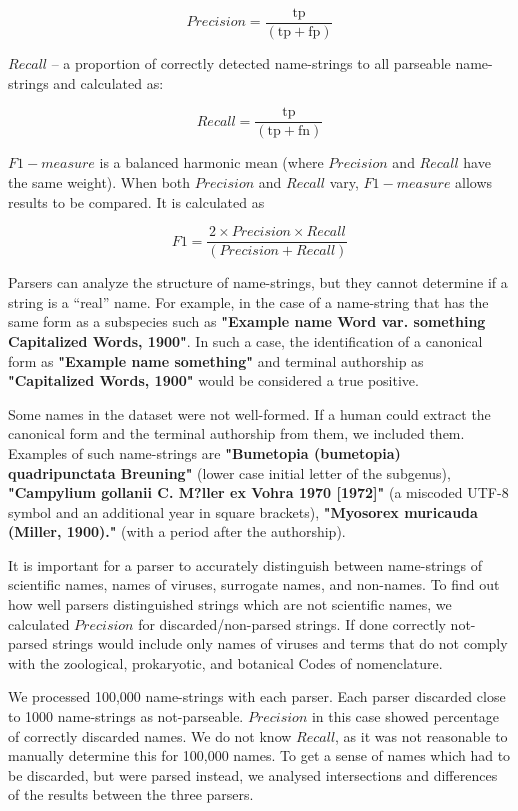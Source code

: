 \documentclass{bmcart}
\begin{document}
\[Precision = \dfrac{\text{tp}}{(\text{tp} + \text{fp})}\]

$Recall$ -- a proportion of correctly detected name-strings to all parseable
name-strings and calculated as:

\[Recall = \dfrac{\text{tp}}{(\text{tp} + \text{fn})}\]

$F1-measure$ is a balanced harmonic mean (where $Precision$ and $Recall$ have
the same weight). When both $Precision$ and $Recall$ vary, $F1-measure$ allows
results to be compared. It is calculated as

\[F1 = \dfrac{2 \times Precision \times Recall}{(Precision + Recall)}\]

Parsers can analyze the structure of name-strings, but they cannot determine if
a string is a ``real'' name. For example, in the case of a name-string that has
the same form as a subspecies such as \textbf{"Example name Word var. something
Capitalized Words, 1900"}. In such a case, the identification of a canonical
form as \textbf{"Example name something"} and terminal authorship as
\textbf{"Capitalized Words, 1900"} would be considered a true positive.

Some names in the dataset were not well-formed. If a human could extract the
canonical form and the terminal authorship from them, we included them.
Examples of such name-strings are \textbf{"Bumetopia (bumetopia) quadripunctata
Breuning"} (lower case initial letter of the subgenus), \textbf{"Campylium
gollanii C. M?ller ex Vohra 1970 [1972]"} (a miscoded UTF-8 symbol and an
additional year in square brackets), \textbf{"Myosorex muricauda (Miller,
1900)."} (with a period after the authorship).

It is important for a parser to accurately distinguish between name-strings of
scientific names, names of viruses, surrogate names, and non-names. To find out
how well parsers distinguished strings which are not scientific names, we
calculated $Precision$ for discarded/non-parsed strings. If done correctly
not-parsed strings would include only names of viruses and terms that do not
comply with the zoological, prokaryotic, and botanical Codes of nomenclature.

 We processed 100,000 name-strings with
each parser.  Each parser discarded close to 1000 name-strings as
not-parseable.  $Precision$ in this case showed percentage of correctly
discarded names.  We do not know $Recall$, as it was not reasonable to manually
determine this for 100,000 names. To get a sense of names which had to be
discarded, but were parsed instead, we analysed intersections and differences
of the results between the three parsers.
\end{document}
